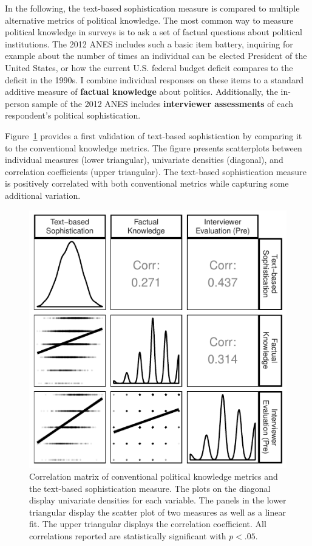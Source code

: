 \documentclass[12pt]{article}
\begin{document}
In the following, the text-based sophistication measure is compared to multiple alternative metrics of political knowledge. The most common way to measure political knowledge in surveys is to ask a set of factual questions about political institutions. The 2012 ANES includes such a basic item battery, inquiring for example about the number of times an individual can be elected President of the United States, or how the current U.S. federal budget deficit compares to the deficit in the 1990s. I combine individual responses on these items to a standard additive measure of \textbf{factual knowledge} about politics. Additionally, the in-person sample of the 2012 ANES includes \textbf{interviewer assessments} of each respondent's political sophistication.


Figure~\ref{fig:corplot} provides a first validation of text-based sophistication by comparing it to the conventional knowledge metrics. The figure presents scatterplots between individual measures (lower triangular), univariate densities (diagonal), and correlation coefficients (upper triangular). The text-based sophistication measure is positively correlated with both conventional metrics while capturing some additional variation.

\begin{figure}[h]\centering
\includegraphics{../fig/corplot_pres.pdf}
\caption{Correlation matrix of conventional political knowledge metrics and the text-based sophistication measure. The plots on the diagonal display univariate densities for each variable. The panels in the lower triangular display the scatter plot of two measures as well as a linear fit. The upper triangular displays the correlation coefficient. All correlations reported are statistically significant with $p<.05$.}\label{fig:corplot}
\end{figure}
\end{document}
